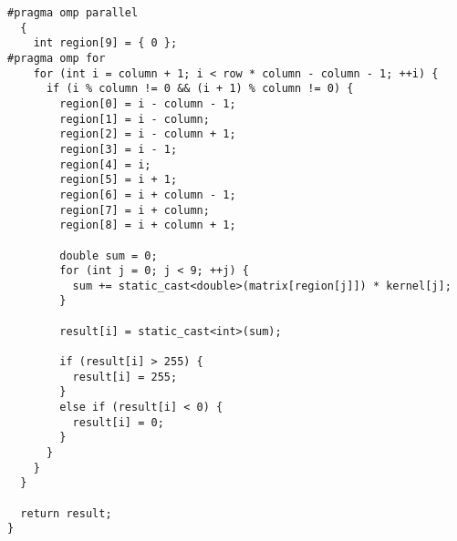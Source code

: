 \documentclass{report}
\begin{document}
\begin{lstlisting}
#pragma omp parallel
  {
    int region[9] = { 0 };
#pragma omp for
    for (int i = column + 1; i < row * column - column - 1; ++i) {
      if (i % column != 0 && (i + 1) % column != 0) {
        region[0] = i - column - 1;
        region[1] = i - column;
        region[2] = i - column + 1;
        region[3] = i - 1;
        region[4] = i;
        region[5] = i + 1;
        region[6] = i + column - 1;
        region[7] = i + column;
        region[8] = i + column + 1;

        double sum = 0;
        for (int j = 0; j < 9; ++j) {
          sum += static_cast<double>(matrix[region[j]]) * kernel[j];
        }

        result[i] = static_cast<int>(sum);

        if (result[i] > 255) {
          result[i] = 255;
        }
        else if (result[i] < 0) {
          result[i] = 0;
        }
      }
    }
  }

  return result;
}
\end{lstlisting}
\end{document}
